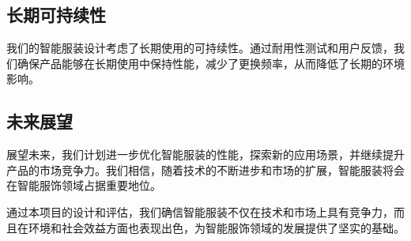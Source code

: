 \documentclass[12pt,hyperref,a4paper,UTF8]{ctexart}
\begin{document}
\subsection*{长期可持续性}
我们的智能服装设计考虑了长期使用的可持续性。通过耐用性测试和用户反馈，我们确保产品能够在长期使用中保持性能，减少了更换频率，从而降低了长期的环境影响。

\subsection*{未来展望}
展望未来，我们计划进一步优化智能服装的性能，探索新的应用场景，并继续提升产品的市场竞争力。我们相信，随着技术的不断进步和市场的扩展，智能服装将会在智能服饰领域占据重要地位。

通过本项目的设计和评估，我们确信智能服装不仅在技术和市场上具有竞争力，而且在环境和社会效益方面也表现出色，为智能服饰领域的发展提供了坚实的基础。


\newpage


\end{document}
